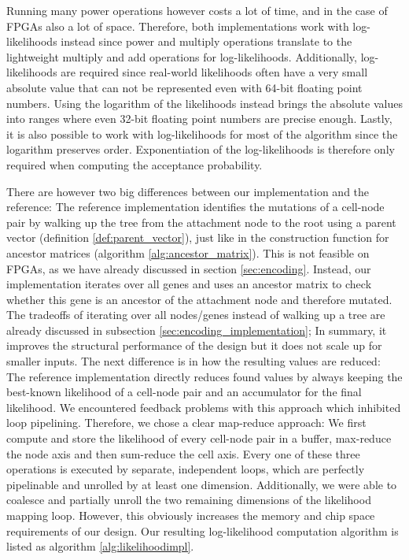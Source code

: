 Running many power operations however costs a lot of time, and in the case of \acp{FPGA} also a lot of space. Therefore, both implementations work with log-likelihoods instead since power and multiply operations translate to the lightweight multiply and add operations for log-likelihoods. Additionally, log-likelihoods are required since real-world likelihoods often have a very small absolute value that can not be represented even with 64-bit floating point numbers. Using the logarithm of the likelihoods instead brings the absolute values into ranges where even 32-bit floating point numbers are precise enough. Lastly, it is also possible to work with log-likelihoods for most of the algorithm since the logarithm preserves order. Exponentiation of the log-likelihoods is therefore only required when computing the acceptance probability.

There are however two big differences between our implementation and the reference: The reference implementation identifies the mutations of a cell-node pair by walking up the tree from the attachment node to the root using a parent vector (definition \ref{def:parent_vector}), just like in the construction function for ancestor matrices (algorithm \ref{alg:ancestor_matrix}). This is not feasible on \acp{FPGA}, as we have already discussed in section \ref{sec:encoding}. Instead, our implementation iterates over all genes and uses an ancestor matrix to check whether this gene is an ancestor of the attachment node and therefore mutated. The tradeoffs of iterating over all nodes/genes instead of walking up a tree are already discussed in subsection \ref{sec:encoding_implementation}; In summary, it improves the structural performance of the design but it does not scale up for smaller inputs. The next difference is in how the resulting values are reduced: The reference implementation directly reduces found values by always keeping the best-known likelihood of a cell-node pair and an accumulator for the final likelihood. We encountered feedback problems with this approach which inhibited loop pipelining. Therefore, we chose a clear map-reduce approach: We first compute and store the likelihood of every cell-node pair in a buffer, max-reduce the node axis and then sum-reduce the cell axis. Every one of these three operations is executed by separate, independent loops, which are perfectly pipelinable and unrolled by at least one dimension. Additionally, we were able to coalesce and partially unroll the two remaining dimensions of the likelihood mapping loop. However, this obviously increases the memory and chip space requirements of our design. Our resulting log-likelihood computation algorithm is listed as algorithm \ref{alg:likelihoodimpl}.


